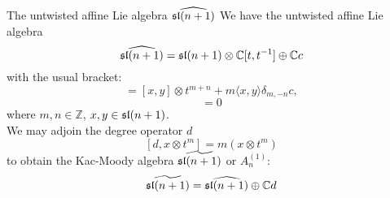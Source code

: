 \documentclass{beamer}
\begin{document}


\begin{frame}{The untwisted affine Lie algebra $\widehat{\frak{sl}(n+1)}$}
We have the untwisted affine Lie algebra $$\widehat{\frak{sl}(n+1)} = \frak{sl}(n+1) \otimes \mathbb{C}[t,t^{-1}] \oplus \mathbb{C}c$$ 
\pause
with the usual bracket:
\begin{equation*}
[ x \otimes t^m, y \otimes t^n ] = [x, y] \otimes t^{m+n} + m \langle x, y \rangle \delta _{m , -n} c,
\end{equation*}
\begin{equation*}
[x \otimes t^m, c] = 0
\end{equation*}
where $m,n \in \mathbb{Z}$, $x,y \in \frak{sl}(n+1)$. \\
\pause
We may adjoin the degree operator $d$
$$[d,x\otimes t^m] = m(x\otimes t^m)$$
to obtain the Kac-Moody algebra $\widetilde{\frak{sl}(n+1)}$ or $A_n^{(1)}$:
$$\widetilde{\frak{sl}(n+1)} = \widehat{\frak{sl}(n+1)} \oplus \mathbb{C}d$$

\end{frame}
\end{document}
